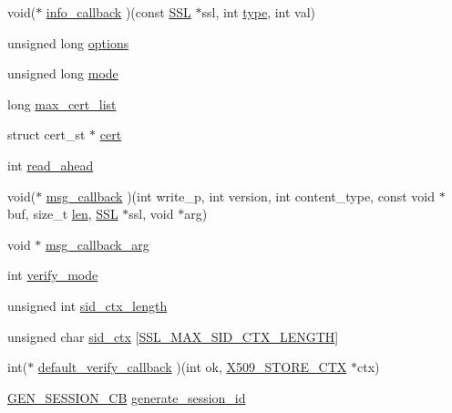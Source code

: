 \begin{DoxyCompactItemize}
\item 
void($\ast$ \hyperlink{structssl__ctx__st_aad6ab81d36b3ea41bc75aa86586396dc}{info\+\_\+callback} )(const \hyperlink{ossl__typ_8h_a71f21e09bf365489dab9d85bd4785e24}{S\+SL} $\ast$ssl, int \hyperlink{x509_8h_ab512b8f495325c7ea0f5a5a5d3f938eb}{type}, int val)
\item 
unsigned long \hyperlink{structssl__ctx__st_aeca7f42401b9a9465d47a206f155f6ba}{options}
\item 
unsigned long \hyperlink{structssl__ctx__st_a15675b65ff5a91cc12c75247cec9c90e}{mode}
\item 
long \hyperlink{structssl__ctx__st_a7ee4c1615f56a2034547f06d040613df}{max\+\_\+cert\+\_\+list}
\item 
struct cert\+\_\+st $\ast$ \hyperlink{structssl__ctx__st_a12fd74ab996b83c38cd73136a1163471}{cert}
\item 
int \hyperlink{structssl__ctx__st_a454cbb1294b6b36ab36cff39c541ba70}{read\+\_\+ahead}
\item 
void($\ast$ \hyperlink{structssl__ctx__st_ada261e72ed5d3ce460ca6dcf34ec53dd}{msg\+\_\+callback} )(int write\+\_\+p, int version, int content\+\_\+type, const void $\ast$buf, size\+\_\+t \hyperlink{x509_8h_ad8c3db4434e9cb5cd772cc009f40e856}{len}, \hyperlink{ossl__typ_8h_a71f21e09bf365489dab9d85bd4785e24}{S\+SL} $\ast$ssl, void $\ast$arg)
\item 
void $\ast$ \hyperlink{structssl__ctx__st_ad1aba043a97ea40fcb8a39e65698f8c0}{msg\+\_\+callback\+\_\+arg}
\item 
int \hyperlink{structssl__ctx__st_a31f82e30439244c12f51daff24fd40d8}{verify\+\_\+mode}
\item 
unsigned int \hyperlink{structssl__ctx__st_a59afab8285fbc901d590ab6edaa75bd0}{sid\+\_\+ctx\+\_\+length}
\item 
unsigned char \hyperlink{structssl__ctx__st_a92f94c2a4612e04ec3c075c76aae5553}{sid\+\_\+ctx} \mbox{[}\hyperlink{ssl_8h_a5cef804495c6414283f4f29d4cea0dd0}{S\+S\+L\+\_\+\+M\+A\+X\+\_\+\+S\+I\+D\+\_\+\+C\+T\+X\+\_\+\+L\+E\+N\+G\+TH}\mbox{]}
\item 
int($\ast$ \hyperlink{structssl__ctx__st_aa6c4ede4479002d346cee1bb1be14a46}{default\+\_\+verify\+\_\+callback} )(int ok, \hyperlink{ossl__typ_8h_ae681945a2cf88d6337137dc0260a1545}{X509\+\_\+\+S\+T\+O\+R\+E\+\_\+\+C\+TX} $\ast$ctx)
\item 
\hyperlink{ssl_8h_a65a9d48d5b4f31797d3ce43e3ac7a8a1}{G\+E\+N\+\_\+\+S\+E\+S\+S\+I\+O\+N\+\_\+\+CB} \hyperlink{structssl__ctx__st_a4485f799f50830d69fa26e7514b032dc}{generate\+\_\+session\+\_\+id}

\end{DoxyCompactItemize}
